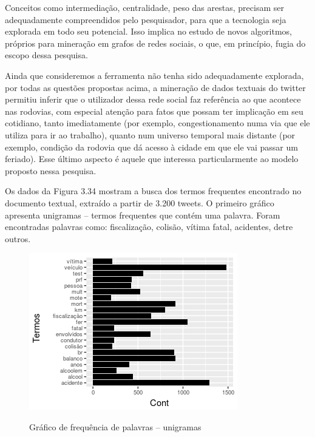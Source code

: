 Conceitos como intermediação, centralidade, peso das arestas, precisam ser adequadamente compreendidos pelo pesquisador, para que a tecnologia seja explorada em todo seu potencial. Isso implica no estudo de novos algoritmos, próprios para mineração em grafos de redes sociais, o que, em princípio, fugia do escopo dessa pesquisa.

Ainda que consideremos a ferramenta não tenha sido adequadamente explorada, por todas as questões propostas acima, a mineração de dados textuais do twitter permitiu inferir que o utilizador dessa rede social faz referência ao que acontece nas rodovias, com especial atenção para fatos que possam ter implicação em seu cotidiano, tanto imediatamente (por exemplo, congestionamento numa via que ele utiliza para ir ao trabalho), quanto num universo temporal mais distante (por exemplo, condição da rodovia que dá acesso à cidade em que ele vai passar um feriado). Esse último aspecto é aquele que interessa particularmente ao modelo proposto nessa pesquisa.


Os dados da Figura 3.34 mostram a busca dos termos frequentes encontrado no documento textual, extraído a partir de 3.200 tweets. O primeiro gráfico apresenta unigramas -- termos frequentes que contém uma palavra. Foram encontradas palavras como: fiscalização, colisão, vítima fatal, acidentes, detre outros. 



\begin{figure}[!ht]
\centering
\caption{Gráfico de frequência de palavras -- unigramas}
\includegraphics[width=0.7\linewidth]{Figuras/Twitter/freqPalavr}
\label{fig:freqPalavras}
\end{figure}

\qquad

